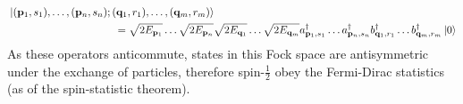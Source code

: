 \begin{equation*}
  \begin{split}
    &\ket{(\mathbf{p}_1,s_1) , \dots , (\mathbf{p}_n,s_n) ; (\mathbf{q}_1,r_1) , \dots , (\mathbf{q}_m,r_m)} \\
    & \qquad \qquad \qquad \qquad \qquad = \sqrt{2E_{\mathbf{p}_1}} \dots \sqrt{2E_{\mathbf{p}_n}} \sqrt{2E_{\mathbf{q}_1}} \dots \sqrt{2E_{\mathbf{q}_m}} a_{\mathbf{p}_1,s_1}^\dagger \dots a_{\mathbf{p}_n,s_n}^\dagger b_{\mathbf{q}_1,r_1}^\dagger \dots b_{\mathbf{q}_m,r_m}^\dagger \ket{0}
  \end{split}
\end{equation*}
As these operators anticommute, states in this Fock space are antisymmetric under the exchange of particles, therefore spin-$ \frac{1}{2} $ obey the Fermi-Dirac statistics (as of the spin-statistic theorem).

